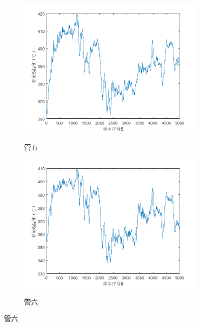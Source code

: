 \begin{figure}[H]
\begin{subfigure}{0.32\textwidth}
                \includegraphics[width=\textwidth]{figures/p1_5.png}
                \label{p1_5}
                \caption{管五}
            \end{subfigure}
            \begin{subfigure}{0.32\textwidth}
                \includegraphics[width=\textwidth]{figures/p1_6.png}
                \label{p1_6}
                \caption{管六}
            \end{subfigure}
        \end{figure}

